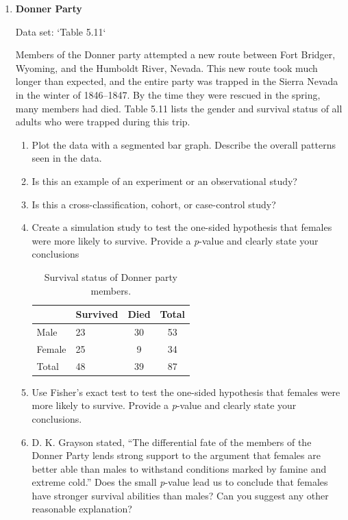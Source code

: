 \documentclass[
]{book}
\begin{document}
\begin{enumerate}
  \item \textbf{Donner Party}    

  Data set: `Table 5.11`    

  Members of the Donner party attempted a new route between Fort Bridger, Wyoming, and the Humboldt River, Nevada. This new route took much longer than expected, and the entire party was trapped in the Sierra Nevada in the winter of 1846–1847. By the time they were rescued in the spring, many members had died. Table 5.11 lists the gender and survival status of all adults who were trapped during this trip.  
  \begin{enumerate}
    \item Plot the data with a segmented bar graph. Describe the overall patterns seen in the data.
    \item Is this an example of an experiment or an observational study?
    \item Is this a cross-classification, cohort, or case-control study?
    \item Create a simulation study to test the one-sided hypothesis that females were more likely to survive. Provide a \textit{p}-value and clearly state your conclusions
    
\begin{table}[!h]
\centering
\caption{\label{tab:tab11}Survival status of Donner party members.}
\centering
\begin{tabular}[t]{llcc}
\toprule
  & Survived & Died & Total\\
\midrule
Male & 23 & 30 & 53\\
Female & 25 & 9 & 34\\
Total & 48 & 39 & 87\\
\bottomrule
\end{tabular}
\end{table}
    \item Use Fisher’s exact test to test the one-sided hypothesis that females were more likely to survive. Provide a \textit{p}-value and clearly state your conclusions.
    \item D. K. Grayson stated, “The differential fate of the members of the Donner Party lends strong support to the argument that females are better able than males to withstand conditions marked by famine and extreme cold.” Does the small \textit{p}-value lead us to conclude that females have stronger survival abilities than males? Can you suggest any other reasonable explanation?
  \end{enumerate}


\end{enumerate}
\end{document}
